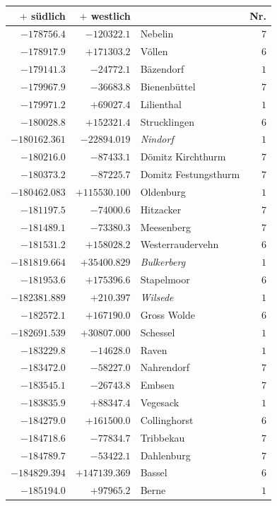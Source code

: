 \clearpage{}%
\begin{center}\begingroup\fontsize{8}{9}\selectfont
\setlength{\tabcolsep}{4pt}
\begin{tabular}{r|r|p{170pt}|r}\hline
\(+\) südlich&\(+\) westlich&&Nr.\\\hline
\(-178756.4\)&\(-120322.1\)&Nebelin&\(7\)\\
\(-178917.9\)&\(+171303.2\)&Völlen&\(6\)\\
\(-179141.3\)&\(-24772.1\)&Bäzendorf&\(1\)\\
\(-179967.9\)&\(-36683.8\)&Bienenbüttel&\(7\)\\
\(-179971.2\)&\(+69027.4\)&Lilienthal&\(1\)\\
\(-180028.8\)&\(+152321.4\)&Strucklingen&\(6\)\\
\(-180162.361\)&\(-22894.019\)&\textit{Nindorf}&\(1\)\\
\(-180216.0\)&\(-87433.1\)&Dömitz Kirchthurm&\(7\)\\
\(-180373.2\)&\(-87225.7\)&Domitz Festungsthurm&\(7\)\\
\(-180462.083\)&\(+115530.100\)&Oldenburg&\(1\)\\
\(-181197.5\)&\(-74000.6\)&Hitzacker&\(7\)\\
\(-181489.1\)&\(-73380.3\)&Meesenberg&\(7\)\\
\(-181531.2\)&\(+158028.2\)&Westerraudervehn&\(6\)\\
\(-181819.664\)&\(+35400.829\)&\textit{Bulkerberg}&\(1\)\\
\(-181953.6\)&\(+175396.6\)&Stapelmoor&\(6\)\\
\(-182381.889\)&\(+210.397\)&\textit{Wilsede}&\(1\)\\
\(-182572.1\)&\(+167190.0\)&Gross Wolde&\(6\)\\
\(-182691.539\)&\(+30807.000\)&Schessel&\(1\)\\
\(-183229.8\)&\(-14628.0\)&Raven&\(1\)\\
\(-183472.0\)&\(-58227.0\)&Nahrendorf&\(7\)\\
\(-183545.1\)&\(-26743.8\)&Embsen&\(7\)\\
\(-183835.9\)&\(+88347.4\)&Vegesack&\(1\)\\
\(-184279.0\)&\(+161500.0\)&Collinghorst&\(6\)\\
\(-184718.6\)&\(-77834.7\)&Tribbekau&\(7\)\\
\(-184789.7\)&\(-53422.1\)&Dahlenburg&\(7\)\\
\(-184829.394\)&\(+147139.369\)&Bassel&\(6\)\\
\(-185194.0\)&\(+97965.2\)&Berne&\(1\)\\

\end{tabular}
\end{center}
